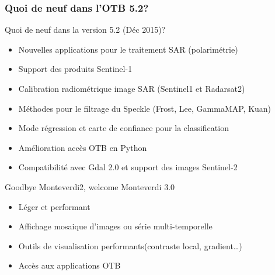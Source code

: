 \documentclass[8pt]{beamer}
\begin{document}
\begin{frame}
\frametitle{Quoi de neuf dans l'OTB 5.2?}
\begin{block}{Quoi de neuf dans la version 5.2 (Déc 2015)?}
\begin{itemize}
\item Nouvelles applications pour le traitement SAR (polarimétrie)
\item Support des produits Sentinel-1
\item Calibration radiométrique image SAR (Sentinel1 et Radarsat2)
\item Méthodes pour le filtrage du Speckle (Frost, Lee, GammaMAP, Kuan)
\item Mode régression et carte de confiance pour la classification
\item Amélioration accès OTB en Python
\item Compatibilité avec Gdal 2.0 et support des images Sentinel-2
\end{itemize}
\end{block}

\begin{block}{Goodbye Monteverdi2, welcome Monteverdi 3.0}
\begin{itemize}
\item Léger et performant
\item Affichage mosaique d'images ou série multi-temporelle
\item Outils de visualisation performants(contraste local, gradient\ldots)
\item Accès aux applications OTB
\end{itemize}
\end{block}
\end{frame}
\end{document}

